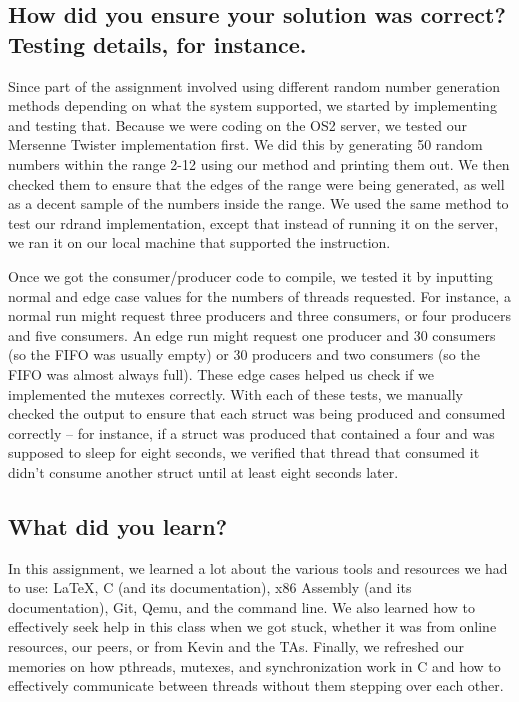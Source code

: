 \documentclass[letterpaper,10pt,titlepage]{article}
\begin{document}
\subsection{How did you ensure your solution was correct? Testing details, for instance.}
Since part of the assignment involved using different random number generation methods depending on what the system supported, we started by implementing and testing that.
Because we were coding on the OS2 server, we tested our Mersenne Twister implementation first.
We did this by generating 50 random numbers within the range 2-12 using our method and printing them out.
We then checked them to ensure that the edges of the range were being generated, as well as a decent sample of the numbers inside the range.
We used the same method to test our rdrand implementation, except that instead of running it on the server, we ran it on our local machine that supported the instruction.

Once we got the consumer/producer code to compile, we tested it by inputting normal and edge case values for the numbers of threads requested.
For instance, a normal run might request three producers and three consumers, or four producers and five consumers.
An edge run might request one producer and 30 consumers (so the FIFO was usually empty) or 30 producers and two consumers (so the FIFO was almost always full).
These edge cases helped us check if we implemented the mutexes correctly.
With each of these tests, we manually checked the output to ensure that each struct was being produced and consumed correctly – for instance, if a struct was produced that contained a four and was supposed to sleep for eight seconds, we verified that thread that consumed it didn’t consume another struct until at least eight seconds later.


\subsection{What did you learn?}
In this assignment, we learned a lot about the various tools and resources we had to use: LaTeX, C (and its documentation), x86 Assembly (and its documentation), Git, Qemu, and the command line.
We also learned how to effectively seek help in this class when we got stuck, whether it was from online resources, our peers, or from Kevin and the TAs.
Finally, we refreshed our memories on how pthreads, mutexes, and synchronization work in C and how to effectively communicate between threads without them stepping over each other.
\end{document}

